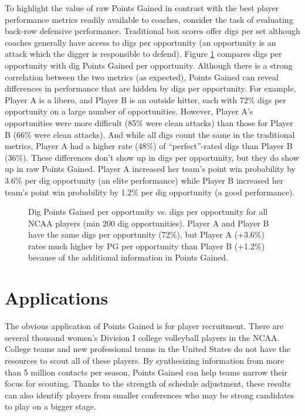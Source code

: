 \documentclass[USenglish]{article}
\theoremstyle{dgthm}
\theoremstyle{dgdef}
\begin{document}
To highlight the value of raw Points Gained in contrast with the best player performance metrics readily available to coaches, consider the task of evaluating back-row defensive performance. Traditional box scores offer digs per set although coaches generally have access to digs per opportunity (an opportunity is an attack which the digger is responsible to defend). Figure \ref{fig:dig-comparison} compares digs per opportunity with dig Points Gained per opportunity. Although there is a strong correlation between the two metrics (as expected), Points Gained can reveal differences in performance that are hidden by digs per opportunity. For example, Player A is a libero, and Player B is an outside hitter, each with 72\% digs per opportunity on a large number of opportunities. However, Player A's opportunities were more difficult (85\% were clean attacks) than those for Player B (66\% were clean attacks). And while all digs count the same in the traditional metrics, Player A had a higher rate (48\%) of ``perfect''-rated digs than Player B (36\%). These differences don't show up in digs per opportunity, but they do show up in raw Points Gained. Player A increased her team's point win probability by 3.6\% per dig opportunity (an elite performance) while Player B increased her team's point win probability by 1.2\% per dig opportunity (a good performance).

\begin{figure}
    \centering
    \caption{Dig Points Gained per opportunity vs. digs per opportunity for all NCAA players (min 200 dig opportunities). Player A and Player B have the same digs per opportunity (72\%), but Player A (+3.6\%) rates much higher by PG per opportunity than Player B (+1.2\%) because of the additional information in Points Gained.}
    \label{fig:dig-comparison}
\end{figure}


\section{Applications}
\label{sec:applications}

The obvious application of Points Gained is for player recruitment. There are several thousand women's Division I college volleyball players in the NCAA. College teams and new professional teams in the United States do not have the resources to scout all of these players. By synthesizing information from more than 5 million contacts per season, Points Gained can help teams narrow their focus for scouting. Thanks to the strength of schedule adjustment, these results can also identify players from smaller conferences who may be strong candidates to play on a bigger stage.
\end{document}
